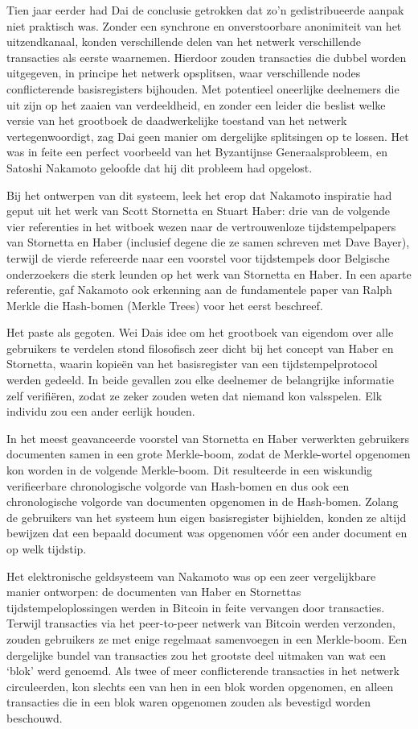 \documentclass[
  a5paper,
  smalldemyvopaper,11pt,twoside,onecolumn,openright,extrafontsizes]{memoir}
\begin{document}
Tien jaar eerder had Dai de conclusie getrokken dat zo'n gedistribueerde
aanpak niet praktisch was. Zonder een synchrone en onverstoorbare
anonimiteit van het uitzendkanaal, konden verschillende delen van het
netwerk verschillende transacties als eerste waarnemen. Hierdoor zouden
transacties die dubbel worden uitgegeven, in principe het netwerk
opsplitsen, waar verschillende nodes conflicterende basisregisters
bijhouden. Met potentieel oneerlijke deelnemers die uit zijn op het
zaaien van verdeeldheid, en zonder een leider die beslist welke versie
van het grootboek de daadwerkelijke toestand van het netwerk
vertegenwoordigt, zag Dai geen manier om dergelijke splitsingen op te
lossen. Het was in feite een perfect voorbeeld van het Byzantijnse
Generaalsprobleem, en Satoshi Nakamoto geloofde dat hij dit probleem had
opgelost.

Bij het ontwerpen van dit systeem, leek het erop dat Nakamoto inspiratie
had geput uit het werk van Scott Stornetta en Stuart Haber: drie van de
volgende vier referenties in het witboek wezen naar de vertrouwenloze
tijdstempelpapers van Stornetta en Haber (inclusief degene die ze samen
schreven met Dave Bayer), terwijl de vierde refereerde naar een voorstel
voor tijdstempels door Belgische onderzoekers die sterk leunden op het
werk van Stornetta en Haber. In een aparte referentie, gaf Nakamoto ook
erkenning aan de fundamentele paper van Ralph Merkle die Hash-bomen
(Merkle Trees) voor het eerst beschreef.

Het paste als gegoten. Wei Dais idee om het grootboek van eigendom over
alle gebruikers te verdelen stond filosofisch zeer dicht bij het concept
van Haber en Stornetta, waarin kopieën van het basisregister van een
tijdstempelprotocol werden gedeeld. In beide gevallen zou elke deelnemer
de belangrijke informatie zelf verifiëren, zodat ze zeker zouden weten
dat niemand kon valsspelen. Elk individu zou een ander eerlijk houden.

In het meest geavanceerde voorstel van Stornetta en Haber verwerkten
gebruikers documenten samen in een grote Merkle-boom, zodat de
Merkle-wortel opgenomen kon worden in de volgende Merkle-boom. Dit
resulteerde in een wiskundig verifieerbare chronologische volgorde van
Hash-bomen en dus ook een chronologische volgorde van documenten
opgenomen in de Hash-bomen. Zolang de gebruikers van het systeem hun
eigen basisregister bijhielden, konden ze altijd bewijzen dat een
bepaald document was opgenomen vóór een ander document en op welk
tijdstip.

Het elektronische geldsysteem van Nakamoto was op een zeer vergelijkbare
manier ontworpen: de documenten van Haber en Stornettas
tijdstempeloplossingen werden in Bitcoin in feite vervangen door
transacties. Terwijl transacties via het peer-to-peer netwerk van
Bitcoin werden verzonden, zouden gebruikers ze met enige regelmaat
samenvoegen in een Merkle-boom. Een dergelijke bundel van transacties
zou het grootste deel uitmaken van wat een `blok' werd genoemd. Als twee
of meer conflicterende transacties in het netwerk circuleerden, kon
slechts een van hen in een blok worden opgenomen, en alleen transacties
die in een blok waren opgenomen zouden als bevestigd worden beschouwd.
\end{document}
